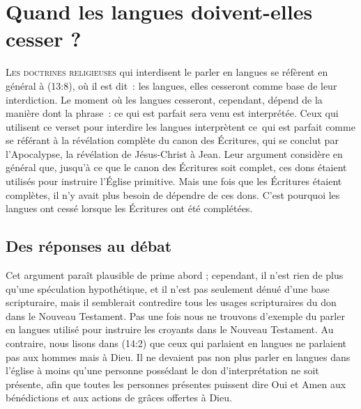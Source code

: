 \chapter{Quand les langues doivent-elles cesser ?}

\lettrine{L}{es doctrines religieuses} qui interdisent le parler en langues
 se réfèrent en général à (13:8), où il est dit~:
 \og les langues, elles cesseront \fg{} comme base de leur interdiction.
 Le moment où les langues cesseront, cependant, dépend de la manière
 dont la phrase~: \og ce qui est parfait sera venu \fg{} est interprétée.
 Ceux qui utilisent ce verset pour interdire les langues interprètent
 \og ce~qui est parfait \fg{} comme se référant à la révélation complète
 du canon des Écritures, qui se conclut par l'Apocalypse,
 la révélation de Jésus-Christ à Jean. Leur argument considère en général que,
 jusqu'à ce que le canon des Écritures soit complet, ces dons étaient
 utilisés pour instruire l'Église primitive. Mais une fois que les Écritures
 étaient complètes, il n'y avait plus besoin de dépendre de ces dons.
 C'est pourquoi les langues ont cessé lorsque les Écritures
 ont été complétées.


\section{Des r\'eponses au d\'ebat}

Cet argument paraît plausible de prime abord ; cependant, il n'est rien
 de plus qu'une spéculation hypothétique, et il n'est pas seulement dénué
 d'une base scripturaire, mais il semblerait contredire tous les usages
 scripturaires du don dans le Nouveau Testament.
 Pas une fois nous ne trouvons d'exemple du parler en langues utilisé
 pour instruire les croyants dans le Nouveau Testament. Au contraire,
 nous lisons dans (14:2) que ceux qui parlaient en langues
 ne parlaient pas aux hommes mais à Dieu. Il ne devaient pas non plus parler
 en langues dans l'église à moins qu'une personne possédant le don
 d'interprétation ne soit présente, afin que toutes les personnes présentes
 puissent dire \og Oui \fg{} et \og Amen \fg{} aux bénédictions
 et aux actions de grâces offertes à Dieu.

